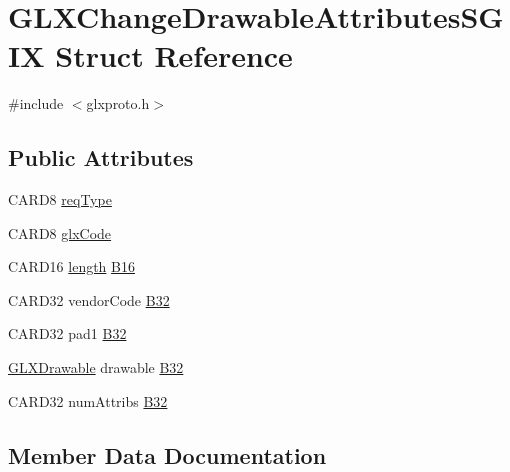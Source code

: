\hypertarget{struct_g_l_x_change_drawable_attributes_s_g_i_x}{}\section{G\+L\+X\+Change\+Drawable\+Attributes\+S\+G\+IX Struct Reference}
\label{struct_g_l_x_change_drawable_attributes_s_g_i_x}


{\ttfamily \#include $<$glxproto.\+h$>$}

\subsection*{Public Attributes}
\begin{DoxyCompactItemize}
\item 
C\+A\+R\+D8 \hyperlink{struct_g_l_x_change_drawable_attributes_s_g_i_x_aebac50c09149ac6500a7034aa86743ed}{req\+Type}
\item 
C\+A\+R\+D8 \hyperlink{struct_g_l_x_change_drawable_attributes_s_g_i_x_aac8fa62d864f1fb4dc93d3a767507cf0}{glx\+Code}
\item 
C\+A\+R\+D16 \hyperlink{glcorearb_8h_ab9c919755bde3b34349e23a32b4e0fa7}{length} \hyperlink{struct_g_l_x_change_drawable_attributes_s_g_i_x_ab7fb91fced1a8bfd6efef40eff738443}{B16}
\item 
C\+A\+R\+D32 vendor\+Code \hyperlink{struct_g_l_x_change_drawable_attributes_s_g_i_x_a5647487b428f5f761769a99afc3cbbc4}{B32}
\item 
C\+A\+R\+D32 pad1 \hyperlink{struct_g_l_x_change_drawable_attributes_s_g_i_x_aa25dbe520a3151b59727efe561d98244}{B32}
\item 
\hyperlink{glx_8h_a826f51745d9d6c81bdbac47ae2b80cf7}{G\+L\+X\+Drawable} drawable \hyperlink{struct_g_l_x_change_drawable_attributes_s_g_i_x_a9fcbb0ea9279dde29c20dab5a9133341}{B32}
\item 
C\+A\+R\+D32 num\+Attribs \hyperlink{struct_g_l_x_change_drawable_attributes_s_g_i_x_a27225f610afafeb1711fcea6a4caca03}{B32}
\end{DoxyCompactItemize}


\subsection{Member Data Documentation}
\mbox{\label{struct_g_l_x_change_drawable_attributes_s_g_i_x_ab7fb91fced1a8bfd6efef40eff738443}} 
